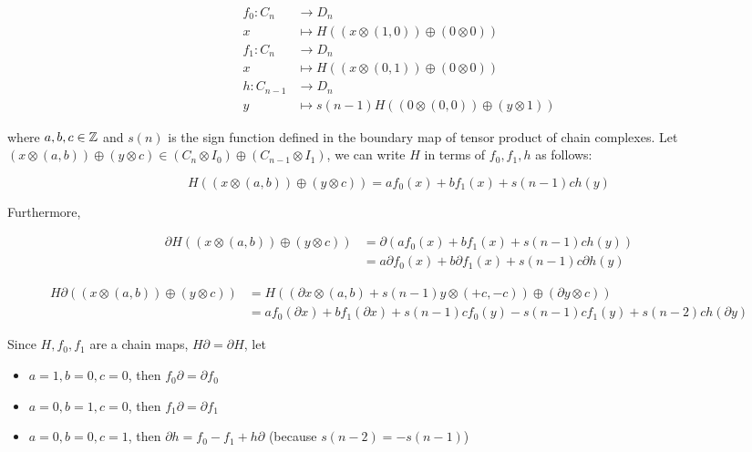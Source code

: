 \documentclass{article}
\begin{document}
\begin{align*}
    f_0: C_n &\to D_n \\
    x &\mapsto H((x \otimes (1, 0)) \oplus (0 \otimes 0)) \\
    f_1: C_n &\to D_n \\
    x &\mapsto H((x \otimes (0, 1)) \oplus (0 \otimes 0)) \\
    h: C_{n-1} &\to D_n \\
    y &\mapsto s(n-1) H((0 \otimes (0, 0)) \oplus (y \otimes 1))
\end{align*}

where $a, b, c \in \mathbb{Z}$ and $s(n)$ is the sign function defined in the boundary map of tensor product of chain complexes. Let $(x \otimes (a, b)) \oplus (y \otimes c) \in (C_n \otimes I_0) \oplus (C_{n-1} \otimes I_1)$, we can write $H$ in terms of $f_0, f_1, h$ as follows:

$$
H ((x \otimes (a, b)) \oplus (y \otimes c)) = a f_0(x) + b f_1(x) + s(n-1) c h(y)
$$

Furthermore,

\begin{align*}
    \partial H ((x \otimes (a, b)) \oplus (y \otimes c))
    &= \partial (a f_0(x) + b f_1(x) + s(n-1) c h(y) ) \\
    &= a \partial f_0 (x) + b \partial f_1(x) + s(n-1) c \partial h(y)
\end{align*}

\begin{align*}
    H \partial ((x \otimes (a, b)) \oplus (y \otimes c))
    &= H ((\partial x \otimes (a, b) + s(n-1) y \otimes (+c, -c)) \oplus (\partial y \otimes c)) \\
    &= a f_0(\partial x) + b f_1(\partial x) + s(n-1) c f_0(y) - s(n-1) c f_1(y) + s(n-2) c h (\partial y)
\end{align*}

Since $H, f_0, f_1$ are a chain maps, $H \partial = \partial H$, let

\begin{itemize}
    \item $a = 1, b = 0, c = 0$, then $f_0 \partial = \partial f_0$
    \item $a = 0, b = 1, c = 0$, then $f_1 \partial = \partial f_1$
    \item $a = 0, b = 0, c = 1$, then $\partial h = f_0 - f_1 + h \partial$ (because $s(n-2) = -s(n-1)$)
\end{itemize}
\end{document}
